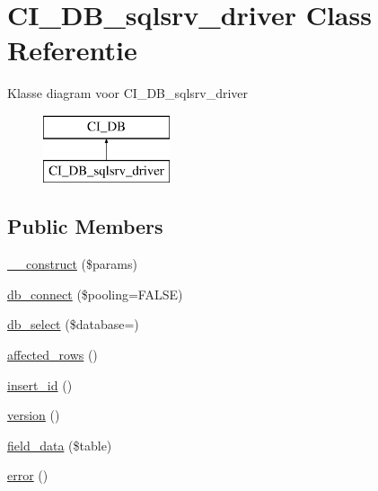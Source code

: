 \hypertarget{class_c_i___d_b__sqlsrv__driver}{}\section{C\+I\+\_\+\+D\+B\+\_\+sqlsrv\+\_\+driver Class Referentie}
\label{class_c_i___d_b__sqlsrv__driver}
Klasse diagram voor C\+I\+\_\+\+D\+B\+\_\+sqlsrv\+\_\+driver\begin{figure}[H]
\begin{center}
\leavevmode
\includegraphics[height=2.000000cm]{class_c_i___d_b__sqlsrv__driver}
\end{center}
\end{figure}
\subsection*{Public Members}
\begin{DoxyCompactItemize}
\item 
\mbox{\hyperlink{class_c_i___d_b__sqlsrv__driver_a9162320adff1a1a4afd7f2372f753a3e}{\+\_\+\+\_\+construct}} (\$params)
\item 
\mbox{\hyperlink{class_c_i___d_b__sqlsrv__driver_a6d26c8c9642181bd1124a45342f669f7}{db\+\_\+connect}} (\$pooling=F\+A\+L\+SE)
\item 
\mbox{\hyperlink{class_c_i___d_b__sqlsrv__driver_a18ae9c21870b30b45337c5e3626190cc}{db\+\_\+select}} (\$database=\textquotesingle{}\textquotesingle{})
\item 
\mbox{\hyperlink{class_c_i___d_b__sqlsrv__driver_a77248aaad33eb132c04cc4aa3f4bc8cb}{affected\+\_\+rows}} ()
\item 
\mbox{\hyperlink{class_c_i___d_b__sqlsrv__driver_a933f2cde8dc7f87875e257d0a4902e99}{insert\+\_\+id}} ()
\item 
\mbox{\hyperlink{class_c_i___d_b__sqlsrv__driver_a6080dae0886626b9a4cedb29240708b1}{version}} ()
\item 
\mbox{\hyperlink{class_c_i___d_b__sqlsrv__driver_a90355121e1ed009e0efdbd544ab56efa}{field\+\_\+data}} (\$table)
\item 
\mbox{\hyperlink{class_c_i___d_b__sqlsrv__driver_a43b8d30b879d4f09ceb059b02af2bc02}{error}} ()
\end{DoxyCompactItemize}
